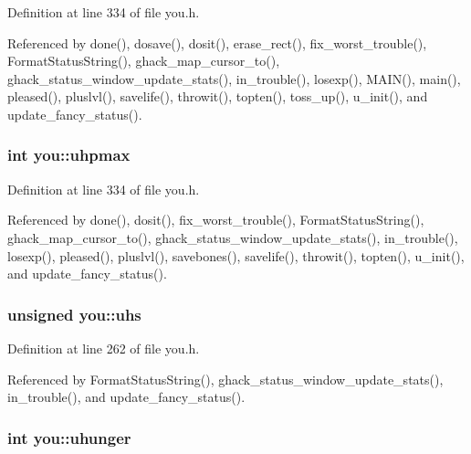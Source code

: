 Definition at line 334 of file you.\+h.



Referenced by done(), dosave(), dosit(), erase\+\_\+rect(), fix\+\_\+worst\+\_\+trouble(), Format\+Status\+String(), ghack\+\_\+map\+\_\+cursor\+\_\+to(), ghack\+\_\+status\+\_\+window\+\_\+update\+\_\+stats(), in\+\_\+trouble(), losexp(), M\+A\+I\+N(), main(), pleased(), pluslvl(), savelife(), throwit(), topten(), toss\+\_\+up(), u\+\_\+init(), and update\+\_\+fancy\+\_\+status().

\hypertarget{structyou_ade36670a142a7d38051c74740d02002b}{
\subsubsection[{uhpmax}]{\setlength{\rightskip}{0pt plus 5cm}int you\+::uhpmax}}\label{structyou_ade36670a142a7d38051c74740d02002b}


Definition at line 334 of file you.\+h.



Referenced by done(), dosit(), fix\+\_\+worst\+\_\+trouble(), Format\+Status\+String(), ghack\+\_\+map\+\_\+cursor\+\_\+to(), ghack\+\_\+status\+\_\+window\+\_\+update\+\_\+stats(), in\+\_\+trouble(), losexp(), pleased(), pluslvl(), savebones(), savelife(), throwit(), topten(), u\+\_\+init(), and update\+\_\+fancy\+\_\+status().

\hypertarget{structyou_a4ba11c494ae99f9d1ba9d65ad07c5097}{
\subsubsection[{uhs}]{\setlength{\rightskip}{0pt plus 5cm}unsigned you\+::uhs}}\label{structyou_a4ba11c494ae99f9d1ba9d65ad07c5097}


Definition at line 262 of file you.\+h.



Referenced by Format\+Status\+String(), ghack\+\_\+status\+\_\+window\+\_\+update\+\_\+stats(), in\+\_\+trouble(), and update\+\_\+fancy\+\_\+status().

\hypertarget{structyou_a66fb9624339df35ac2f9f08fdccde6c9}{
\subsubsection[{uhunger}]{\setlength{\rightskip}{0pt plus 5cm}int you\+::uhunger}}\label{structyou_a66fb9624339df35ac2f9f08fdccde6c9}


